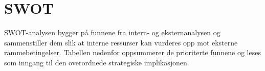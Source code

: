 \section{SWOT}

SWOT-analysen bygger på funnene fra intern- og eksternanalysen og
sammenstiller
dem slik at interne ressurser kan vurderes opp mot eksterne rammebetingelser.
Tabellen nedenfor oppsummerer de prioriterte funnene og leses som inngang til
den overordnede strategiske implikasjonen.

